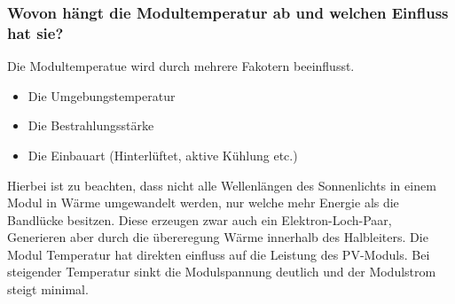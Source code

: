 \subsubsection{Wovon hängt die Modultemperatur ab und welchen Einfluss hat sie?}
Die Modultemperatue wird durch mehrere Fakotern beeinflusst.
\begin{itemize}
    \item Die Umgebungstemperatur
    \item Die Bestrahlungsstärke
    \item Die Einbauart (Hinterlüftet, aktive Kühlung etc.)
\end{itemize}
Hierbei ist zu beachten, dass nicht alle Wellenlängen des Sonnenlichts in einem Modul in Wärme umgewandelt werden, nur welche mehr Energie als die Bandlücke besitzen.
Diese erzeugen zwar auch ein Elektron-Loch-Paar, Generieren aber durch die übereregung Wärme innerhalb des Halbleiters.
Die Modul Temperatur hat direkten einfluss auf die Leistung des PV-Moduls.
Bei steigender Temperatur sinkt die Modulspannung deutlich und der Modulstrom steigt minimal.
